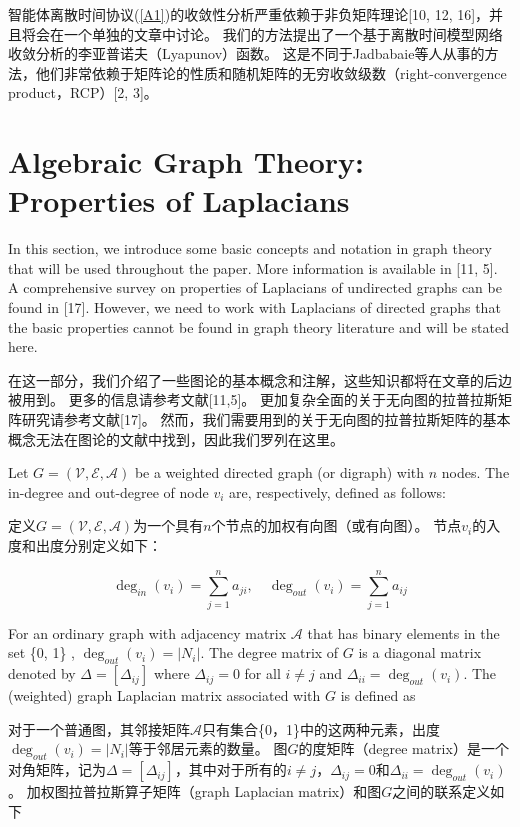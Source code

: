 \documentclass{article}
\begin{document}
智能体离散时间协议(\ref{A1})的收敛性分析严重依赖于非负矩阵理论[10, 12, 16]，并且将会在一个单独的文章中讨论。
我们的方法提出了一个基于离散时间模型网络收敛分析的李亚普诺夫（Lyapunov）函数。
这是不同于Jadbabaie等人从事的方法，他们非常依赖于矩阵论的性质和随机矩阵的无穷收敛级数（right-convergence product，RCP）[2, 3]。


\section{Algebraic Graph Theory: Properties of Laplacians}
{\color[gray]{0.5}
\noindent In this section, we introduce some basic concepts and notation in graph theory that will be used throughout the paper. 
More information is available in [11, 5]. 
A comprehensive survey on properties of Laplacians of undirected graphs can be found in [17]. 
However, we need to work with Laplacians of directed graphs that the basic properties cannot be found in graph theory literature and will be stated here.
}

\noindent 在这一部分，我们介绍了一些图论的基本概念和注解，这些知识都将在文章的后边被用到。
更多的信息请参考文献[11,5]。
更加复杂全面的关于无向图的拉普拉斯矩阵研究请参考文献[17]。
然而，我们需要用到的关于无向图的拉普拉斯矩阵的基本概念无法在图论的文献中找到，因此我们罗列在这里。

{\color[gray]{0.5}
Let $G=(\mathcal{V}, \mathcal{E}, \mathcal{A})$ be a weighted directed graph (or digraph) with $n$ nodes. 
The in-degree and out-degree of node $v_i$ are, respectively, deﬁned as follows:
}

定义$G=(\mathcal{V}, \mathcal{E}, \mathcal{A})$为一个具有$n$个节点的加权有向图（或有向图）。
节点$v_i$的入度和出度分别定义如下：

\begin{equation}
    \deg_{in}(v_i) = \sum_{j=1}^{n}a_{ji},\quad \deg_{out}(v_i) = \sum_{j=1}^{n}a_{ij}
    \tag{11}
    \label{11}
\end{equation}

{\color[gray]{0.5}
\noindent For an ordinary graph with adjacency matrix $\mathcal{A}$ that has binary elements in the set \{0, 1\} , $\deg_{out}(v_i) = |N_i|$. 
The degree matrix of $G$ is a diagonal matrix denoted by $\Delta=[\Delta_{ij}]$ where $\Delta_{ij}=0$ for all $i\ne j$ and $\Delta_{ii}=\deg_{out}(v_i)$. 
The (weighted) graph Laplacian matrix associated with $G$ is deﬁned as
}

\noindent 对于一个普通图，其邻接矩阵$\mathcal{A}$只有集合\{0，1\}中的这两种元素，出度$\deg_{out}(v_i) = |N_i|$等于邻居元素的数量。
图$G$的度矩阵（degree matrix）是一个对角矩阵，记为$\Delta=[\Delta_{ij}]$，其中对于所有的$i\ne j$，$\Delta_{ij}=0$和$\Delta_{ii}=\deg_{out}(v_i)$。
加权图拉普拉斯算子矩阵（graph Laplacian matrix）和图$G$之间的联系定义如下
\end{document}
